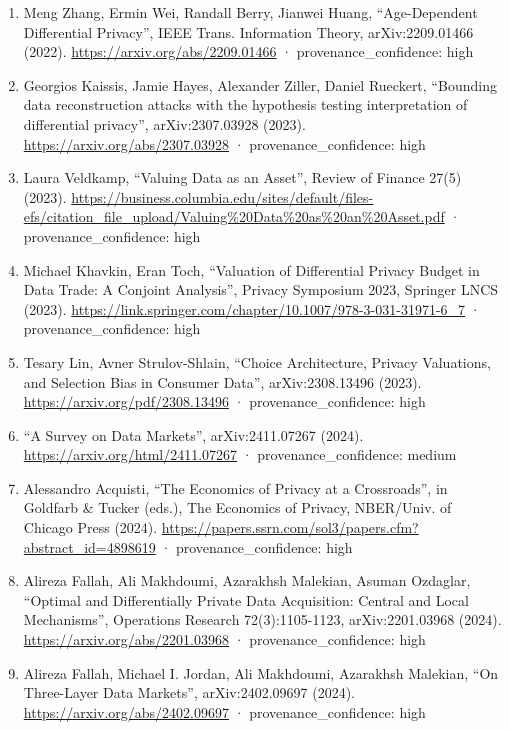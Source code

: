 \documentclass[
  11pt,
]{article}
\begin{document}
\begin{enumerate}
  Science 68(9), arXiv:2109.10028 (2022).
  \url{https://arxiv.org/abs/2109.10028} · provenance\_confidence: high
\item
  Meng Zhang, Ermin Wei, Randall Berry, Jianwei Huang, ``Age-Dependent
  Differential Privacy'', IEEE Trans. Information Theory,
  arXiv:2209.01466 (2022). \url{https://arxiv.org/abs/2209.01466} ·
  provenance\_confidence: high
\item
  Georgios Kaissis, Jamie Hayes, Alexander Ziller, Daniel Rueckert,
  ``Bounding data reconstruction attacks with the hypothesis testing
  interpretation of differential privacy'', arXiv:2307.03928 (2023).
  \url{https://arxiv.org/abs/2307.03928} · provenance\_confidence: high
\item
  Laura Veldkamp, ``Valuing Data as an Asset'', Review of Finance 27(5)
  (2023).
  \url{https://business.columbia.edu/sites/default/files-efs/citation_file_upload/Valuing\%20Data\%20as\%20an\%20Asset.pdf}
  · provenance\_confidence: high
\item
  Michael Khavkin, Eran Toch, ``Valuation of Differential Privacy Budget
  in Data Trade: A Conjoint Analysis'', Privacy Symposium 2023, Springer
  LNCS (2023).
  \url{https://link.springer.com/chapter/10.1007/978-3-031-31971-6_7} ·
  provenance\_confidence: high
\item
  Tesary Lin, Avner Strulov-Shlain, ``Choice Architecture, Privacy
  Valuations, and Selection Bias in Consumer Data'', arXiv:2308.13496
  (2023). \url{https://arxiv.org/pdf/2308.13496} ·
  provenance\_confidence: high
\item
  ``A Survey on Data Markets'', arXiv:2411.07267 (2024).
  \url{https://arxiv.org/html/2411.07267} · provenance\_confidence:
  medium
\item
  Alessandro Acquisti, ``The Economics of Privacy at a Crossroads'', in
  Goldfarb \& Tucker (eds.), The Economics of Privacy, NBER/Univ. of
  Chicago Press (2024).
  \url{https://papers.ssrn.com/sol3/papers.cfm?abstract_id=4898619} ·
  provenance\_confidence: high
\item
  Alireza Fallah, Ali Makhdoumi, Azarakhsh Malekian, Asuman Ozdaglar,
  ``Optimal and Differentially Private Data Acquisition: Central and
  Local Mechanisms'', Operations Research 72(3):1105-1123,
  arXiv:2201.03968 (2024). \url{https://arxiv.org/abs/2201.03968} ·
  provenance\_confidence: high
\item
  Alireza Fallah, Michael I. Jordan, Ali Makhdoumi, Azarakhsh Malekian,
  ``On Three-Layer Data Markets'', arXiv:2402.09697 (2024).
  \url{https://arxiv.org/abs/2402.09697} · provenance\_confidence: high

\end{enumerate}
\end{document}
